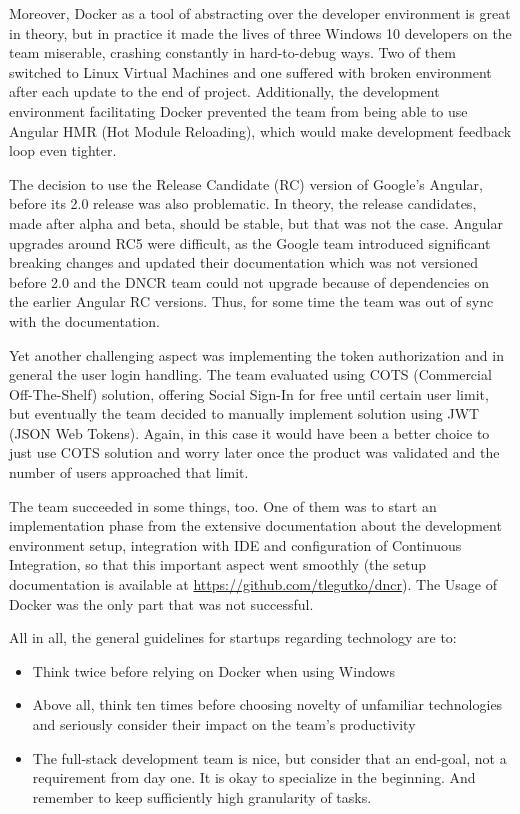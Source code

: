 \documentclass{article}
\begin{document}
Moreover, Docker as a tool of abstracting over the developer environment is great in theory, but in practice it made the lives of three Windows 10 developers on the team miserable, crashing constantly in hard-to-debug ways. Two of them switched to Linux Virtual Machines and one suffered with broken environment after each update to the end of project. Additionally, the development environment facilitating Docker prevented the team from being able to use Angular HMR (Hot Module Reloading), which would make development feedback loop even tighter.

The decision to use the Release Candidate (RC) version of Google's Angular, before its 2.0 release was also problematic. In theory, the release candidates, made after alpha and beta, should be stable, but that was not the case. Angular upgrades around RC5 were difficult, as the Google team introduced significant breaking changes and updated their documentation which was not versioned before 2.0 and the DNCR team could not upgrade because of dependencies on the earlier Angular RC versions. Thus, for some time the team was out of sync with the documentation.

Yet another challenging aspect was implementing the token authorization and in general the user login handling. The team evaluated using COTS (Commercial Off-The-Shelf) solution, offering Social Sign-In for free until certain user limit, but eventually the team decided to manually implement solution using JWT (JSON Web Tokens). Again, in this case it would have been a better choice to just use COTS solution and worry later once the product was validated and the number of users approached that limit.

The team succeeded in some things, too. One of them was to start an implementation phase from the extensive documentation about the development environment setup, integration with IDE and configuration of Continuous Integration, so that this important aspect went smoothly (the setup documentation is available at \url{https://github.com/tlegutko/dncr}). The Usage of Docker was the only part that was not successful.

All in all, the general guidelines for startups regarding technology are to:
\begin{itemize}
\item Think twice before relying on Docker when using Windows
\item Above all, think ten times before choosing novelty of unfamiliar technologies and seriously consider their impact on the team's productivity
\item The full-stack development team is nice, but consider that an end-goal, not a requirement from day one. It is okay to specialize in the beginning. And remember to keep sufficiently high granularity of tasks.
\end{itemize}
\end{document}
